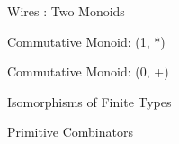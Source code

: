 \documentclass[svgnames,11pt]{beamer}
\begin{document}
\begin{frame}[fragile]{Wires : Two Monoids}


  \begin{block}{Commutative Monoid: {{(1, *)}} }
    

  \end{block}

  \begin{block}{Commutative Monoid: {{(0, +)}} }


  \end{block}


\end{frame}


\begin{frame}[fragile]{ Isomorphisms of Finite Types }


  \begin{block}{ Primitive Combinators }
    




  \end{block}


\end{frame}
\end{document}

